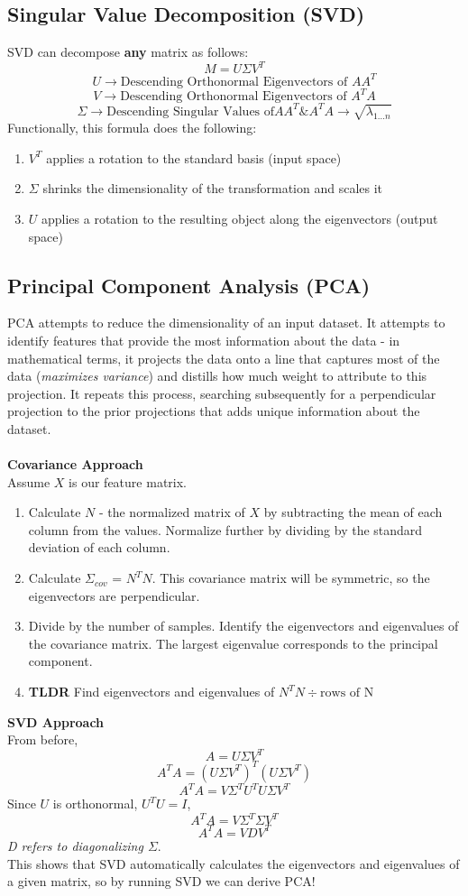 \documentclass{article}
\begin{document}
\subsection{Singular Value Decomposition (SVD)}
SVD can decompose \textbf{any} matrix as follows: $$M = U\Sigma V^T$$
$$U \rightarrow \text{Descending Orthonormal Eigenvectors of } AA^T$$
$$V \rightarrow \text{Descending Orthonormal Eigenvectors of }A^TA$$
$$\Sigma \rightarrow \text{Descending Singular Values of} AA^T \text{\& } A^TA \rightarrow \sqrt{\lambda_{1...n}}$$
Functionally, this formula does the following: 
\begin{enumerate}
    \item $V^T$ applies a rotation to the standard basis (input space)
    \item $\Sigma$ shrinks the dimensionality of the transformation and scales it
    \item $U$ applies a rotation to the resulting object along the eigenvectors (output space)
\end{enumerate}

\subsection{Principal Component Analysis (PCA)}
PCA attempts to reduce the dimensionality of an input dataset. It attempts to identify features that provide the most information about the data - in mathematical terms, it projects the data onto a line that captures most of the data (\textit{maximizes variance}) and distills how much weight to attribute to this projection. It repeats this process, searching subsequently for a perpendicular projection to the prior projections that adds unique information about the dataset. \\\\
\textbf{Covariance Approach}\\
Assume $X$ is our feature matrix.
\begin{enumerate}
    \item Calculate $N$ - the normalized matrix of $X$ by subtracting the mean of each column from the values. Normalize further by dividing by the standard deviation of each column. 
    \item Calculate $\Sigma_{cov}$ = $N^TN$. This covariance matrix will be symmetric, so the eigenvectors are perpendicular.
    \item Divide by the number of samples. Identify the eigenvectors and eigenvalues of the covariance matrix. The largest eigenvalue corresponds to the principal component. 
    \item \textbf{TLDR} Find eigenvectors and eigenvalues of $N^TN \div \text{rows of N}$
\end{enumerate}
\textbf{SVD Approach}\\
From before,
$$A = U\Sigma V^{T}$$
$$A^TA = (U\Sigma V^{T})^T(U\Sigma V^{T})$$
$$A^TA = V\Sigma ^TU^TU\Sigma V^T$$
Since $U$ is orthonormal, $U^TU = I$,
$$A^TA = V\Sigma ^T\Sigma V^T$$
$$A^TA = VD V^T$$ \textit{D refers to diagonalizing $\Sigma$}. \\
This shows that SVD automatically calculates the eigenvectors and eigenvalues of a given matrix, so by running SVD we can derive PCA!
\end{document}
